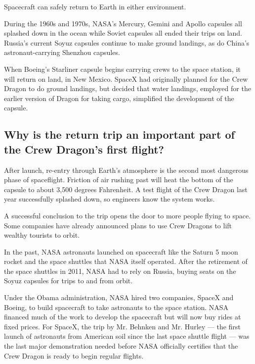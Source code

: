 Spacecraft can safely return to Earth in either environment.

During the 1960s and 1970s, NASA's Mercury, Gemini and Apollo capsules
all splashed down in the ocean while Soviet capsules all ended their
trips on land. Russia's current Soyuz capsules continue to make ground
landings, as do China's astronaut-carrying Shenzhou capsules.

When Boeing's Starliner capsule begins carrying crews to the space
station, it will return on land, in New Mexico. SpaceX had originally
planned for the Crew Dragon to do ground landings, but decided that
water landings, employed for the earlier version of Dragon for taking
cargo, simplified the development of the capsule.

\hypertarget{why-is-the-return-trip-an-important-part-of-the-crew-dragons-first-flight}{%
\subsection{Why is the return trip an important part of the Crew
Dragon's first
flight?}\label{why-is-the-return-trip-an-important-part-of-the-crew-dragons-first-flight}}

After launch, re-entry through Earth's atmosphere is the second most
dangerous phase of spaceflight. Friction of air rushing past will heat
the bottom of the capsule to about 3,500 degrees Fahrenheit. A test
flight of the Crew Dragon last year successfully splashed down, so
engineers know the system works.

A successful conclusion to the trip opens the door to more people flying
to space. Some companies have already announced plans to use Crew
Dragons to lift wealthy tourists to orbit.

In the past, NASA astronauts launched on spacecraft like the Saturn 5
moon rocket and the space shuttles that NASA itself operated. After the
retirement of the space shuttles in 2011, NASA had to rely on Russia,
buying seats on the Soyuz capsules for trips to and from orbit.

Under the Obama administration, NASA hired two companies, SpaceX and
Boeing, to build spacecraft to take astronauts to the space station.
NASA financed much of the work to develop the spacecraft but will now
buy rides at fixed prices. For SpaceX, the trip by Mr. Behnken and Mr.
Hurley --- the first launch of astronauts from American soil since the
last space shuttle flight --- was the last major demonstration needed
before NASA officially certifies that the Crew Dragon is ready to begin
regular flights.

